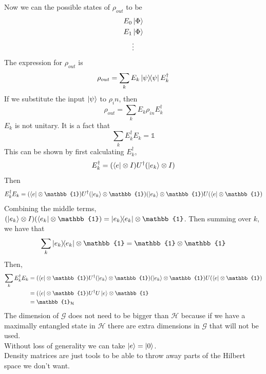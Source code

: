 Now we can the possible states of $\rho_{out}$ to be 
\begin{align}
    E_0 &\ket{\Phi} \\ 
    E_1 &\ket{\Phi} \\ 
    &\vdots
\end{align}
The expression for $\rho_{out}$ is
\begin{equation}
    \rho_{out} = \sum_k E_k \ketbra{\psi}E_k^\dagger 
\end{equation}
If we substitute the input $\ket{\psi}$ to $\rho_in$, then 
\begin{equation}
    \rho_{out} = \sum_k E_k \rho_{in} E_k^\dagger 
\end{equation}
$E_k$ is not unitary. It is a fact that 
\begin{equation}
    \sum_k E_k^\dagger E_k = \mathbb{1}
\end{equation}
This can be shown by first calculating $E_k^\dagger$,
\begin{equation}
    E_k^\dagger = (\bra{e} \otimes I ) U^
    \dagger (\ket{e_k} \otimes I )
\end{equation}
Then
\begin{equation}
    E_k^\dagger E_k = (\bra{e} \otimes \mathbb{1} ) U^
    \dagger (\ket{e_k} \otimes \mathbb{1}) (\ket{e_k} \otimes \mathbb{1}) U  (\bra{e} \otimes \mathbb{1} )
\end{equation}
Combining the middle terms, $(\ket{e_k} \otimes I) (\bra{e_k} \otimes \mathbb{1}) = \ketbra{e_k} \otimes \mathbb{1}$. Then summing over $k$,
we have that 
\begin{equation}
    \sum_k \ketbra{e_k} \otimes \mathbb{1} = \mathbb{1} \otimes \mathbb{1}
\end{equation}
Then, 
\begin{align}
    \sum_k E_k^\dagger E_k &= (\bra{e} \otimes \mathbb{1} ) U^
    \dagger (\ket{e_k} \otimes \mathbb{1}) (\ket{e_k} \otimes \mathbb{1}) U  (\bra{e} \otimes \mathbb{1} ) \\
    &= (\bra{e} \otimes \mathbb{1} ) U^
    \dagger U \ket{e} \otimes \mathbb{1} \\
    & = \mathbb{1}_{\mathcal{H}}
\end{align}
The dimension of $\mathcal{G}$ does not need to be bigger than $\mathcal{H}$ because if we have a maximally entangled state in $\mathcal{H}$ there are extra dimensions in $\mathcal{G}$ that will not be used.\\
Without loss of generality we can take $\ket{e} = \ket{0}$. \\
Density matrices are just tools to be able to throw away parts of the Hilbert space we don't want. 



